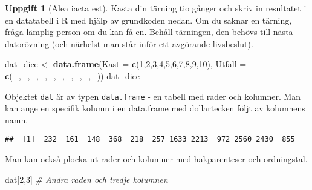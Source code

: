 \documentclass[
]{book}
\newenvironment{Shaded}{\begin{snugshade}}{\end{snugshade}}
\newcommand{\AttributeTok}[1]{\textcolor[rgb]{0.13,0.29,0.53}{#1}}
\newcommand{\CommentTok}[1]{\textcolor[rgb]{0.56,0.35,0.01}{\textit{#1}}}
\newcommand{\DecValTok}[1]{\textcolor[rgb]{0.00,0.00,0.81}{#1}}
\newcommand{\FunctionTok}[1]{\textcolor[rgb]{0.13,0.29,0.53}{\textbf{#1}}}
\newcommand{\NormalTok}[1]{#1}
\newcommand{\OtherTok}[1]{\textcolor[rgb]{0.56,0.35,0.01}{#1}}
\newcommand{\SpecialCharTok}[1]{\textcolor[rgb]{0.81,0.36,0.00}{\textbf{#1}}}
\theoremstyle{definition}
\theoremstyle{definition}
\theoremstyle{definition}
\newtheorem{exercise}{Uppgift}[chapter]
\theoremstyle{definition}
\theoremstyle{remark}
\begin{document}
\begin{exercise}[Alea iacta est]

Kasta din tärning tio gånger och skriv in resultatet i en datatabell i R med hjälp av grundkoden nedan. Om du saknar en tärning, fråga lämplig person om du kan få en. Behåll tärningen, den behövs till nästa datorövning (och närhelst man står inför ett avgörande livsbeslut).

\begin{Shaded}
\begin{Highlighting}[]
\NormalTok{dat\_dice }\OtherTok{\textless{}{-}} \FunctionTok{data.frame}\NormalTok{(}\AttributeTok{Kast =} \FunctionTok{c}\NormalTok{(}\DecValTok{1}\NormalTok{,}\DecValTok{2}\NormalTok{,}\DecValTok{3}\NormalTok{,}\DecValTok{4}\NormalTok{,}\DecValTok{5}\NormalTok{,}\DecValTok{6}\NormalTok{,}\DecValTok{7}\NormalTok{,}\DecValTok{8}\NormalTok{,}\DecValTok{9}\NormalTok{,}\DecValTok{10}\NormalTok{),}
                       \AttributeTok{Utfall =} \FunctionTok{c}\NormalTok{(\_,\_,\_,\_,\_,\_,\_,\_,\_,\_))}
\NormalTok{dat\_dice}
\end{Highlighting}
\end{Shaded}

\end{exercise}

Objektet \texttt{dat} är av typen \texttt{data.frame} - en tabell med rader och kolumner. Man kan ange en specifik kolumn i en data.frame med dollartecken följt av kolumnens namn.

\begin{Shaded}
\end{Shaded}

\begin{verbatim}
##  [1]  232  161  148  368  218  257 1633 2213  972 2560 2430  855
\end{verbatim}

Man kan också plocka ut rader och kolumner med hakparenteser och ordningstal.

\begin{Shaded}
\begin{Highlighting}[]
\NormalTok{dat[}\DecValTok{2}\NormalTok{,}\DecValTok{3}\NormalTok{]          }\CommentTok{\# Andra raden och tredje kolumnen}
\end{Highlighting}
\end{Shaded}
\end{document}
